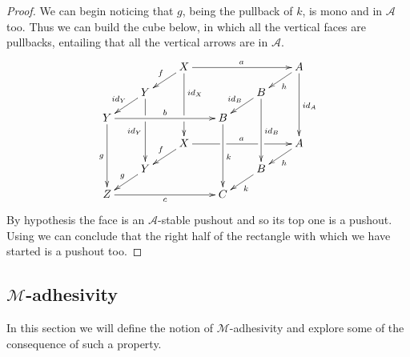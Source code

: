\documentclass[a4paper,UKenglish,cleveref,pdftex, thm-restate,numberwithinsect]{lipics}
\newcommand{\id}[1]{\mathsf{id}_{#1}}
\def\Y{\textbf {\textup{Y}}}
\begin{document}
\begin{proof} We can begin noticing that $g$, being the pullback of $k$, is mono and in $\mathcal{A}$ too. Thus we can build the cube below, in which all the vertical faces are pullbacks, entailing that all the vertical arrows are in $\mathcal{A}$.
	\[\xymatrix@C=20pt@R=10pt{ & &X\ar[dl]_{f} \ar[ddd]^(.333333){\id{X}}|(.666666)\hole\ar[rrr]^{a} &&&A \ar[ddd]^{\id{A}} \ar[dl]^{h}\\& Y\ar[dl]_{\id{Y}} \ar[ddd]|(.333333)\hole_{\id{Y}} &&&B \ar[ddd]^{\id{B}} \ar[dl]_{\id{B}} \\Y \ar[ddd]_{g} \ar[rrr]^{b}&&& B\ar[ddd]^{k}\\&&X \ar[rrr]|(.34)\hole^{a}|(.67)\hole \ar[dl]_{f}&&& A \ar[dl]^{h}\\ & Y  \ar[dl]_{g}&&& B \ar[dl]^{k}\\ Z\ar[rrr]_{c} &&& C}\]
	By hypothesis the face is an $\mathcal{A}$-stable pushout and so its top one is a pushout. Using  we can conclude that the right half of the rectangle with which we have started is a pushout too. \qedhere 
\end{proof}

\subsection{$\mathcal{M}$-adhesivity}

In this section we will define the notion of $\mathcal{M}$-adhesivity \cite{azzi2019essence,ehrig2012,ehrig2014adhesive,heindel2009category,lack2005adhesive} and explore some of the consequence of such a property. 
\end{document}
